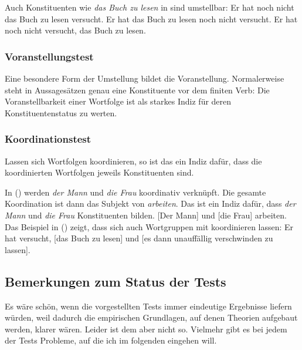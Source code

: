 \noindent
Auch Konstituenten wie \emph{das Buch zu lesen} in 
sind umstellbar:
\eal
\ex Er hat noch nicht das Buch zu lesen versucht.
\ex Er hat das Buch zu lesen noch nicht versucht.
\ex Er hat noch nicht versucht, das Buch zu lesen.
\zl
{}

\subsubsection{Voranstellungstest}

Eine besondere Form der Umstellung bildet die Voranstellung. Normalerweise steht
in Aussagesätzen genau eine Konstituente vor dem finiten Verb:
\eal
\label{bsp-v2}
\zl
Die Voranstellbarkeit einer Wortfolge ist als starkes Indiz für deren Konstituentenstatus
zu werten.

\subsubsection{Koordinationstest}

Lassen sich Wortfolgen koordinieren, so ist das ein Indiz dafür, dass die koordinierten Wortfolgen
jeweils Konstituenten sind.

In () werden \emph{der Mann} und \emph{die Frau} koordinativ verknüpft.
Die gesamte Koordination ist dann das Subjekt von \emph{arbeiten}.
Das ist ein Indiz dafür, dass \emph{der Mann}
und \emph{die Frau} Konstituenten bilden.
\ea
{}[Der Mann] und [die Frau] arbeiten.
\z
Das Beispiel in () zeigt, dass sich auch Wortgruppen mit \zui koordinieren lassen:
\ea
Er hat versucht, [das Buch zu lesen] und [es dann unauffällig verschwinden zu lassen].
\z

\subsection{Bemerkungen zum Status der Tests}
\label{sec-status-der-ktests}

Es wäre schön, wenn die vorgestellten Tests immer eindeutige Ergebnisse liefern würden,
weil dadurch die empirischen Grundlagen, auf denen Theorien aufgebaut werden, klarer
wären. Leider ist dem aber nicht so. Vielmehr gibt es bei jedem der Tests Probleme,
auf die ich im folgenden eingehen will.

